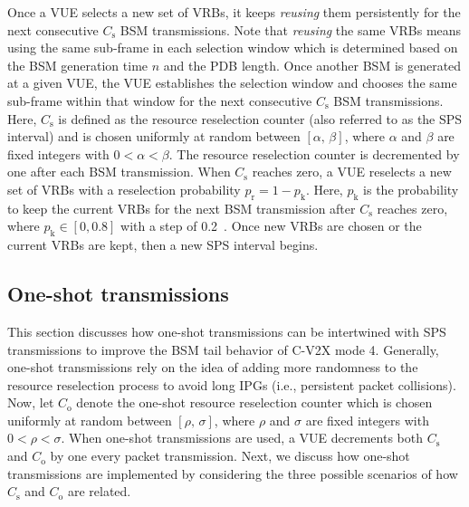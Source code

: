 \documentclass[conference]{IEEEtran}
\begin{document}
Once a VUE selects a new set of VRBs, it keeps \textit{reusing} them persistently for the next consecutive $C_{\mathrm{s}}$ BSM transmissions. Note that \textit{reusing} the same VRBs means using the same sub-frame in each selection window which is determined based on the BSM generation time $n$ and the PDB length. Once another BSM is generated at a given VUE, the VUE establishes the selection window and chooses the same sub-frame within that window for the next consecutive $C_{\mathrm{s}}$ BSM transmissions. Here, $C_{\mathrm{s}}$ is defined as the resource reselection counter (also referred to as the SPS interval) and is chosen uniformly at random between $[\alpha,\,\beta]$, where $\alpha$ and $\beta$ are fixed integers with $0<\alpha<\beta$. The resource reselection counter is decremented by one after each BSM transmission. When $C_{\mathrm{s}}$ reaches zero, a VUE reselects a new set of VRBs with a reselection probability $p_\mathrm{r}=1-p_\mathrm{k}$. Here, $p_\mathrm{k}$ is the probability to keep the current VRBs for the next BSM transmission after $C_{\mathrm{s}}$ reaches zero, where $p_\mathrm{k}\in[0,0.8]$ with a step of 0.2~\cite{J3161}. Once new VRBs are chosen or the current VRBs are kept, then a new SPS interval begins.

\subsection{One-shot transmissions}\label{sec_sub_1shot}
This section discusses how one-shot transmissions can be intertwined with SPS transmissions to improve the BSM tail behavior of C-V2X mode 4. Generally, one-shot transmissions rely on the idea of adding more randomness to the resource reselection process to avoid long IPGs (i.e., persistent packet collisions). Now, let $C_{\mathrm{o}}$ denote the one-shot resource reselection counter which is chosen uniformly at random between $[\rho,\,\sigma]$, where $\rho$ and $\sigma$ are fixed integers with $0<\rho<\sigma$. When one-shot transmissions are used, a VUE decrements both $C_{\mathrm{s}}$ and $C_{\mathrm{o}}$ by one every packet transmission. Next, we discuss how one-shot transmissions are implemented by considering the three possible scenarios of how $C_{\mathrm{s}}$ and $C_{\mathrm{o}}$ are related.   
\end{document}
